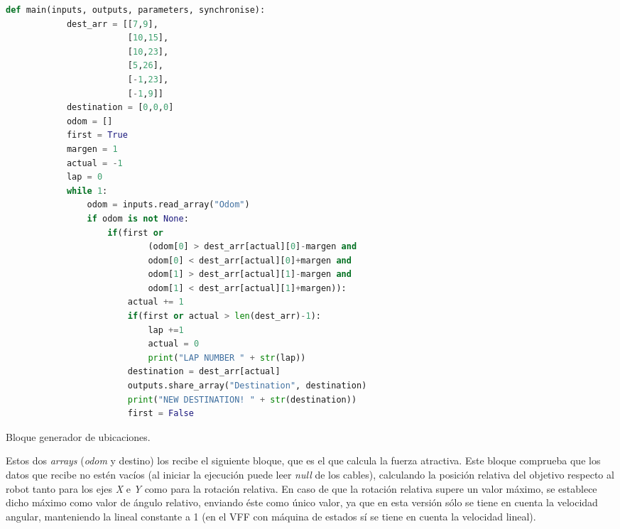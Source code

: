 \begin{code}[H]
    \begin{lstlisting}[language=python]
        def main(inputs, outputs, parameters, synchronise):
            dest_arr = [[7,9],
                        [10,15],
                        [10,23],
                        [5,26],
                        [-1,23],
                        [-1,9]]
            destination = [0,0,0]
            odom = []
            first = True
            margen = 1
            actual = -1
            lap = 0
            while 1:
                odom = inputs.read_array("Odom")
                if odom is not None:
                    if(first or 
                            (odom[0] > dest_arr[actual][0]-margen and 
                            odom[0] < dest_arr[actual][0]+margen and
                            odom[1] > dest_arr[actual][1]-margen and 
                            odom[1] < dest_arr[actual][1]+margen)):
                        actual += 1
                        if(first or actual > len(dest_arr)-1):
                            lap +=1
                            actual = 0    
                            print("LAP NUMBER " + str(lap)) 
                        destination = dest_arr[actual]
                        outputs.share_array("Destination", destination)
                        print("NEW DESTINATION! " + str(destination))
                        first = False
    \end{lstlisting}
    \caption[Bloque generador de ubicaciones]{Bloque generador de ubicaciones.}
    \label{cod:dest_gen}
\end{code}

Estos dos \textit{arrays} (\textit{odom} y destino) los recibe el siguiente bloque, que es el que calcula la fuerza atractiva. Este bloque comprueba que
los datos que recibe no estén vacíos (al iniciar la ejecución puede leer \textit{null} de los cables), calculando la posición relativa del objetivo
respecto al robot tanto para los ejes \textit{X} e \textit{Y} como para la rotación relativa. En caso de que la rotación relativa supere un valor máximo,
se establece dicho máximo como valor de ángulo relativo, enviando éste como único valor, ya que en esta versión sólo se tiene en cuenta la velocidad angular,
manteniendo la lineal constante a 1 (en el VFF con máquina de estados sí se tiene en cuenta la velocidad lineal).

